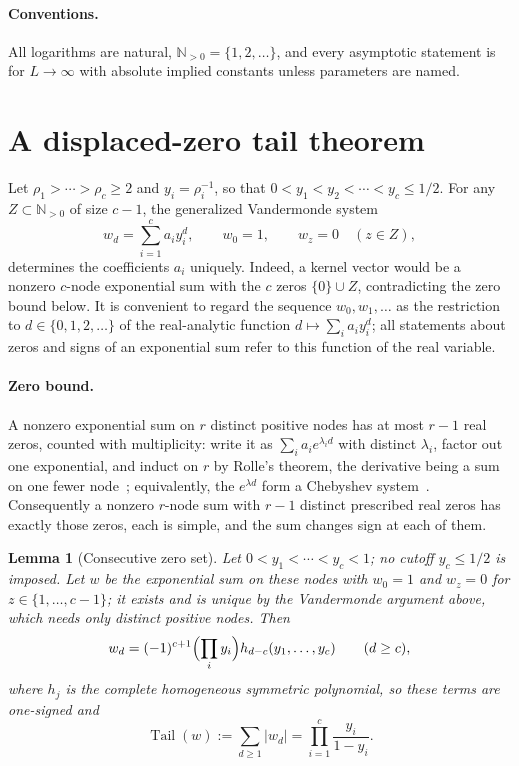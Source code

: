 \documentclass[11pt]{article}
\newtheorem{lemma}[theorem]{Lemma}
\newcommand{\N}{\mathbb N}
\DeclareMathOperator{\Tail}{Tail}
\begin{document}
\paragraph{Conventions.}
All logarithms are natural, $\N_{>0}=\{1,2,\ldots\}$, and every asymptotic
statement is for $L\to\infty$ with absolute implied constants unless
parameters are named.

\section{A displaced-zero tail theorem}

Let $\rho_1>\cdots>\rho_c\ge2$ and $y_i=\rho_i^{-1}$, so that
$0<y_1<y_2<\cdots<y_c\le1/2$.  For any $Z\subset\N_{>0}$ of size $c-1$, the
generalized Vandermonde system
\[
  w_d=\sum_{i=1}^c a_i y_i^d,
  \qquad w_0=1,
  \qquad w_z=0\quad(z\in Z),
\]
determines the coefficients $a_i$ uniquely.  Indeed, a kernel vector would be
a nonzero $c$-node exponential sum with the $c$ zeros $\{0\}\cup Z$,
contradicting the zero bound below.  It is convenient to regard the sequence
$w_0,w_1,\ldots$ as the restriction to $d\in\{0,1,2,\ldots\}$ of the
real-analytic function $d\mapsto\sum_ia_iy_i^d$; all statements about zeros
and signs of an exponential sum refer to this function of the real variable.

\paragraph{Zero bound.}
A nonzero exponential sum on $r$ distinct positive nodes has at most $r-1$
real zeros, counted with multiplicity: write it as $\sum_ia_ie^{\lambda_id}$
with distinct $\lambda_i$, factor out one exponential, and induct on $r$ by
Rolle's theorem, the derivative being a sum on one fewer
node~\cite[Part~Five, Ch.~1]{polya-szego}; equivalently, the $e^{\lambda d}$
form a Chebyshev system~\cite{karlin}.
Consequently a nonzero $r$-node sum with $r-1$
distinct prescribed real zeros has exactly those zeros, each is simple, and the sum
changes sign at each of them.

\begin{lemma}[Consecutive zero set]\label{lem:consecutive}
Let $0<y_1<\cdots<y_c<1$; no cutoff $y_c\le1/2$ is imposed.  Let $w$ be the
exponential sum on these nodes with $w_0=1$ and $w_z=0$ for $z\in\{1,\ldots,c-1\}$;
it exists and is unique by the Vandermonde argument above, which needs only
distinct positive nodes.  Then
\[
  w_d=(-1)^{c+1}\Bigl(\prod_iy_i\Bigr)h_{d-c}(y_1,\ldots,y_c)
  \qquad(d\ge c),
\]
where $h_j$ is the complete homogeneous symmetric polynomial, so these terms
are one-signed and
\[
  \Tail(w):=\sum_{d\ge1}|w_d|=\prod_{i=1}^c\frac{y_i}{1-y_i}.
\]
\end{lemma}
\end{document}
